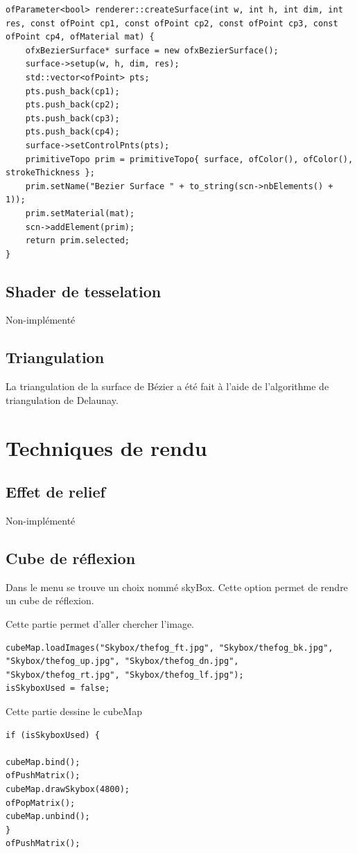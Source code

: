 \begin{lstlisting}
ofParameter<bool> renderer::createSurface(int w, int h, int dim, int res, const ofPoint cp1, const ofPoint cp2, const ofPoint cp3, const ofPoint cp4, ofMaterial mat) {
	ofxBezierSurface* surface = new ofxBezierSurface();
	surface->setup(w, h, dim, res);
	std::vector<ofPoint> pts;
	pts.push_back(cp1);
	pts.push_back(cp2);
	pts.push_back(cp3);
	pts.push_back(cp4);
	surface->setControlPnts(pts);
	primitiveTopo prim = primitiveTopo{ surface, ofColor(), ofColor(), strokeThickness };
	prim.setName("Bezier Surface " + to_string(scn->nbElements() + 1));
	prim.setMaterial(mat);
	scn->addElement(prim);
	return prim.selected;
}
\end{lstlisting}

\subsection{Shader de tesselation}
Non-implémenté

\subsection{Triangulation}
La triangulation de la surface de Bézier a été fait à l'aide de l'algorithme de triangulation de Delaunay. 


\pagebreak
\section{Techniques de rendu}


\subsection{Effet de relief}
Non-implémenté

\subsection{Cube de réflexion}
Dans le menu se trouve un choix nommé skyBox. Cette option permet de rendre un cube de réflexion. 

Cette partie permet d'aller chercher l'image.
\begin{lstlisting}
cubeMap.loadImages("Skybox/thefog_ft.jpg", "Skybox/thefog_bk.jpg", "Skybox/thefog_up.jpg", "Skybox/thefog_dn.jpg", "Skybox/thefog_rt.jpg", "Skybox/thefog_lf.jpg");
isSkyboxUsed = false;
\end{lstlisting}

Cette partie dessine le cubeMap
\begin{lstlisting}
if (isSkyboxUsed) {

cubeMap.bind();
ofPushMatrix();
cubeMap.drawSkybox(4800);
ofPopMatrix();
cubeMap.unbind();
}
ofPushMatrix();
\end{lstlisting}
